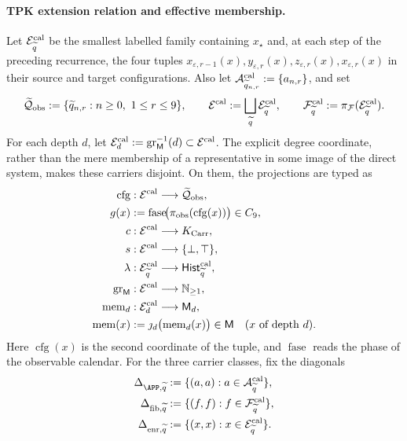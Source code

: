 \paragraph{TPK extension relation and effective membership.}
Let \(\mathcal E^{\rm cal}_{\widetilde q}\) be the smallest labelled family containing
\(x_\star\) and, at each step of the preceding recurrence, the four tuples
\(x_{\varepsilon,r-1}(x),y_{\varepsilon,r}(x),
z_{\varepsilon,r}(x),x_{\varepsilon,r}(x)\) in their source
and target configurations. Also let
\(\mathcal A^{\rm cal}_{\widetilde q_{n,r}}:=\{a_{n,r}\}\), and set
\[
 \widetilde{\mathcal Q}_{\rm obs}:=
   \{\widetilde q_{n,r}:n\ge0,\ 1\le r\le9\},
 \qquad
 \mathcal E^{\rm cal}:=\bigsqcup_{\widetilde q}
     \mathcal E^{\rm cal}_{\widetilde q},
 \qquad
 \mathcal F^{\rm cal}_{\widetilde q}:=
     \pi_{\mathcal F}(\mathcal E^{\rm cal}_{\widetilde q}).
\]
For each depth \(d\), let
\(\mathcal E^{\rm cal}_d:=
\operatorname{gr}_{\mathsf M}^{-1}(d)\subset\mathcal E^{\rm cal}\). The
explicit degree coordinate, rather than the mere membership of a
representative in some image of the direct system, makes these carriers
disjoint. On them, the projections are typed as
\[
\begin{aligned}
 \operatorname{cfg}&:\mathcal E^{\rm cal}\longrightarrow
     \widetilde{\mathcal Q}_{\rm obs},\\
 g(x)&:=\operatorname{fase}\!
       \bigl(\pi_{\rm obs}(\operatorname{cfg}(x))\bigr)\in C_9,\\
 c&:\mathcal E^{\rm cal}\longrightarrow K_{\rm Carr},\\
 s&:\mathcal E^{\rm cal}\longrightarrow\{\bot,\top\},\\
 \lambda&:\mathcal E^{\rm cal}_{\widetilde q}
       \longrightarrow\mathsf{Hist}^{\rm cal}_{\widetilde q},\\
 \operatorname{gr}_{\mathsf M}&:\mathcal E^{\rm cal}
       \longrightarrow\mathbb N_{\ge1},\\
 \operatorname{mem}_d&:\mathcal E^{\rm cal}_d
       \longrightarrow\mathsf M_d,\\
 \operatorname{mem}(x)&:=
       \jmath_d\bigl(\operatorname{mem}_d(x)\bigr)\in\mathsf M
       \quad(x\text{ of depth }d).
\end{aligned}
\]
Here \(\operatorname{cfg}(x)\) is the second coordinate of the tuple, and
\(\operatorname{fase}\) reads the phase of the observable calendar. For the
three carrier classes, fix the diagonals
\[
\begin{aligned}
 \Delta_{\APP,\widetilde q}
   &:=\{(a,a):a\in\mathcal A^{\rm cal}_{\widetilde q}\},\\
 \Delta_{{\rm fib},\widetilde q}
   &:=\{(f,f):f\in\mathcal F^{\rm cal}_{\widetilde q}\},\\
 \Delta_{{\rm enr},\widetilde q}
   &:=\{(x,x):x\in\mathcal E^{\rm cal}_{\widetilde q}\}.
\end{aligned}
\]
